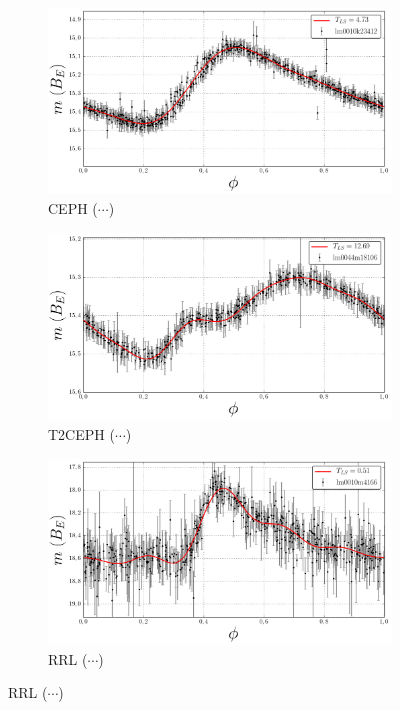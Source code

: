 \begin{figure}[H]
	\centering
	\begin{subfigure}[t]{0.49\textwidth}
		\centering
		\caption{CEPH ($\cdots$)}
		\label{fig:lightcurve-ceph}
		\includegraphics[width=\textwidth]{figures/lightcurves/ceph.png}				
	\end{subfigure}
	\begin{subfigure}[t]{0.49\textwidth}
		\centering
		\caption{T2CEPH ($\cdots$)}
		\label{fig:lightcurve-ceph}
		\includegraphics[width=\textwidth]{figures/lightcurves/t2ceph.png}				
	\end{subfigure}
	\begin{subfigure}[t]{0.49\textwidth}
		\centering
		\caption{RRL ($\cdots$)}
		\label{fig:lightcurve-rrl}
		\includegraphics[width=\textwidth]{figures/lightcurves/rrl.png}		

\end{subfigure}
\end{figure}
